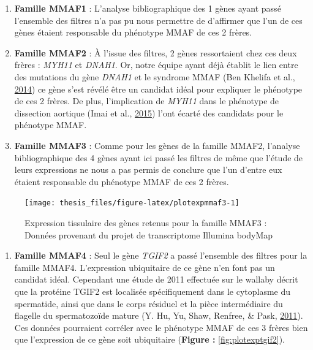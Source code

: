 \documentclass[12pt,twoside]{reedthesis}
\providecommand{\tightlist}{%
  \setlength{\itemsep}{0pt}\setlength{\parskip}{0pt}}
\theoremstyle{definition}
\theoremstyle{definition}
\theoremstyle{remark}
\begin{document}
  \begin{enumerate}
  \def\labelenumi{\arabic{enumi}.}
  \setcounter{enumi}{2}
  \tightlist
  \item
    \textbf{Famille MMAF1} : L'analyse bibliographique des 1 gènes ayant
    passé l'ensemble des filtres n'a pas pu nous permettre de d'affirmer
    que l'un de ces gènes étaient responsable du phénotype MMAF de ces 2
    frères.\\
  \item
    \textbf{Famille MMAF2} : À l'issue des filtres, 2 gènes ressortaient
    chez ces deux frères : \emph{MYH11} et \emph{DNAH1}. Or, notre équipe
    ayant déjà établit le lien entre des mutations du gène \emph{DNAH1} et
    le syndrome MMAF (Ben Khelifa et al.,
    \protect\hyperlink{ref-BenKhelifa2014}{2014}) ce gène s'est révélé
    être un candidat idéal pour expliquer le phénotype de ces 2 frères. De
    plus, l'implication de \emph{MYH11} dans le phénotype de dissection
    aortique (Imai et al., \protect\hyperlink{ref-Imai2015}{2015}) l'ont
    écarté des candidats pour le phénotype MMAF.\\
  \item
    \textbf{Famille MMAF3} : Comme pour les gènes de la famille MMAF2,
    l'analyse bibliographique des 4 gènes ayant ici passé les filtres de
    même que l'étude de leurs expressions ne nous a pas permis de conclure
    que l'un d'entre eux étaient responsable du phénotype MMAF de ces 2
    frères. \newpage
  \end{enumerate}
  
  \begin{figure}
  
  {\centering \texttt{[image: thesis\_files/figure-latex/plotexpmmaf3-1]} 
  
  }
  
  \caption[Expression tissulaire des gènes retenus pour la famille MMAF3]{Expression tissulaire des gènes retenus pour la famille MMAF3 : Données provenant du projet de transcriptome Illumina bodyMap}\label{fig:plotexpmmaf3}
  \end{figure}
  
  \begin{enumerate}
  \def\labelenumi{\arabic{enumi}.}
  \setcounter{enumi}{5}
  \tightlist
  \item
    \textbf{Famille MMAF4} : Seul le gène \emph{TGIF2} a passé l'ensemble
    des filtres pour la famille MMAF4. L'expression ubiquitaire de ce gène
    n'en font pas un candidat idéal. Cependant une étude de 2011 effectuée
    sur le wallaby décrit que la protéine TGIF2 est localisée
    spécifiquement dans le cytoplasme du spermatide, ainsi que dans le
    corps résiduel et la pièce intermédiaire du flagelle du spermatozoïde
    mature (Y. Hu, Yu, Shaw, Renfree, \& Pask,
    \protect\hyperlink{ref-Hu2011}{2011}). Ces données pourraient corréler
    avec le phénotype MMAF de ces 3 frères bien que l'expression de ce
    gène soit ubiquitaire (\textbf{Figure : }\ref{fig:plotexptgif2}).
  \end{enumerate}
  
\end{document}
